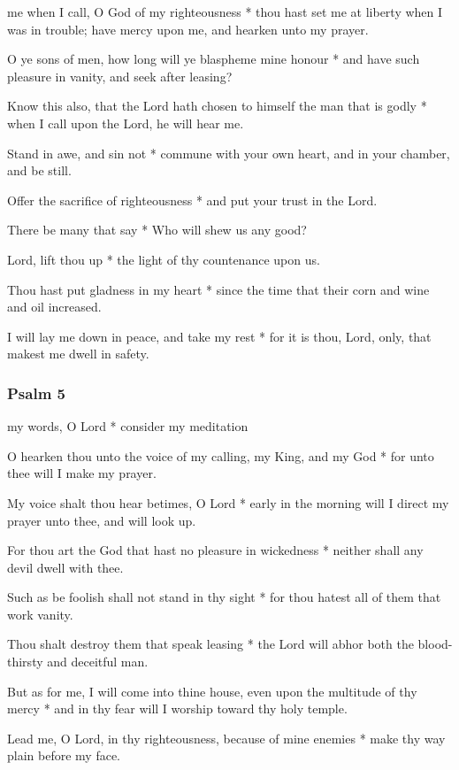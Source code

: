  me when I call, O God of my righteousness * thou hast set me at liberty when I was in trouble; have mercy upon me, and hearken unto my prayer.

O ye sons of men, how long will ye blaspheme mine honour * and have such pleasure in vanity, and seek after leasing?

Know this also, that the Lord hath chosen to himself the man that is godly * when I call upon the Lord, he will hear me.

Stand in awe, and sin not * commune with your own heart, and in your chamber, and be still.

Offer the sacrifice of righteousness * and put your trust in the Lord.

There be many that say * Who will shew us any good?

Lord, lift thou up * the light of thy countenance upon us.

Thou hast put gladness in my heart * since the time that their corn and wine and oil increased.

I will lay me down in peace, and take my rest * for it is thou, Lord, only, that makest me dwell in safety.

\subsubsection{Psalm 5}


 my words, O Lord * consider my meditation

O hearken thou unto the voice of my calling, my King, and my God * for unto thee will I make my prayer.

My voice shalt thou hear betimes, O Lord * early in the morning will I direct my prayer unto thee, and will look up.

For thou art the God that hast no pleasure in wickedness * neither shall any devil dwell with thee.

Such as be foolish shall not stand in thy sight * for thou hatest all of them that work vanity.

Thou shalt destroy them that speak leasing * the Lord will abhor both the blood-thirsty and deceitful man.

But as for me, I will come into thine house, even upon the multitude of thy mercy * and in thy fear will I worship toward thy holy temple.

Lead me, O Lord, in thy righteousness, because of mine enemies * make thy way plain before my face.

